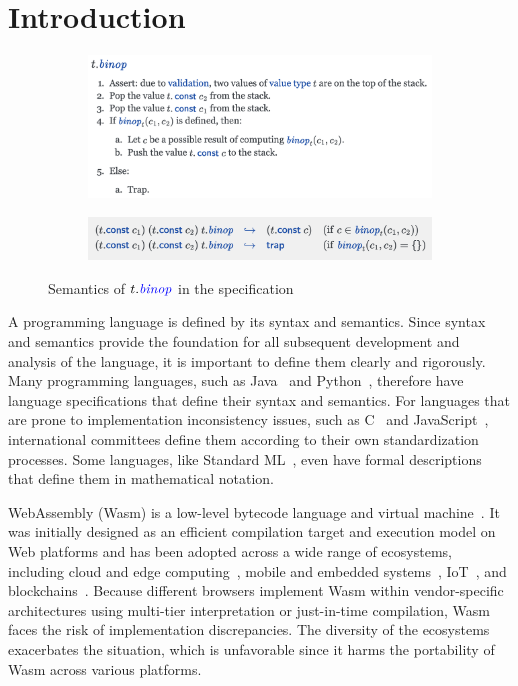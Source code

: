 \section{Introduction}\label{sec:intro}
\begin{figure}[t]
  \centering
  \begin{subfigure}{\textwidth}
    \centering
    \includegraphics[width=.7\textwidth]{../img/spec-prose.png}
\vspace*{-1em}
\vspace*{.5em}
  \end{subfigure}
  \begin{subfigure}{\textwidth}
    \centering
    \includegraphics[width=.7\textwidth]{../img/spec-formal.png}
  \end{subfigure}
\caption{Semantics of \ensuremath{t.\mathit{\inblue{binop}}} in the specification}
\label{fig:spec}
\end{figure}

A programming language is defined by its syntax and semantics.
Since syntax and semantics provide the foundation for all subsequent development and
analysis of the language, it is important to define them clearly and rigorously. 
Many programming languages, such as Java~\cite{javaspec} and Python~\cite{pythonspec},
therefore have language specifications that define their syntax and semantics.
For languages that are prone to implementation inconsistency issues,
such as C~\cite{cstandard} and JavaScript~\cite{ecmascript},
international committees define them according to their own standardization processes.
Some languages, like Standard ML~\cite{sml}, even have formal descriptions
that define them in mathematical notation.

WebAssembly (Wasm) is a low-level bytecode language and virtual machine~\cite{wasmspec}.
It was initially designed as an efficient compilation target and execution model on Web platforms
and has been adopted across a wide range of ecosystems,
including cloud and edge computing~\cite{lucet, cloudflare}, 
mobile and embedded systems~\cite{wasm-embedded}, IoT~\cite{wasm-iot}, and
blockchains~\cite{wasm-blockchain}.
Because different browsers implement Wasm within vendor-specific architectures
using multi-tier interpretation or just-in-time compilation,
Wasm faces the risk of implementation discrepancies.
The diversity of the ecosystems exacerbates the situation,
which is unfavorable since it harms the portability of Wasm across various platforms.

